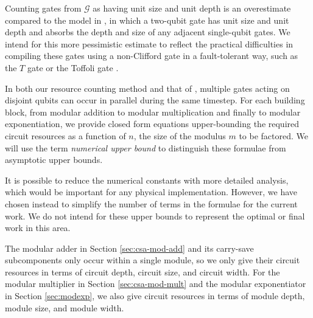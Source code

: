 Counting gates from $\mathcal{G}$ as having unit size and unit depth
is
an overestimate compared to the model in \cite{Kutin2006}, in which a
two-qubit gate has unit size and unit depth and
absorbs the depth and size of any adjacent single-qubit gates. We intend
for this more pessimistic estimate to reflect the practical difficulties
in compiling these gates using a non-Clifford gate in a fault-tolerant way,
such as the $T$ gate or the Toffoli gate
\cite{Fowler2011}.

In both our resource counting method and that of \cite{Fowler2004,Kutin2006}, multiple gates acting on disjoint qubits
can occur in parallel during the same timestep. For each building block,
from modular addition to modular multiplication and finally to modular
exponentiation, we provide closed form equations upper-bounding the required circuit
resources as a function of $n$, the size of the modulus $m$ to be factored.
We will use the
term \emph{numerical upper bound} to distinguish these formulae from asymptotic
upper bounds.

It is possible to reduce the numerical constants with more detailed analysis,
which would be important for any physical implementation.
However, we have chosen instead to simplify the number of terms in the formulae
for the current work. We do not intend for these upper bounds to represent
the optimal or final work in this area.

The modular adder in Section \ref{sec:csa-mod-add} and its carry-save
subcomponents only occur within a single module, so we only give their
circuit resources in terms of circuit depth, circuit size, and circuit width. 
For the modular multiplier in
Section \ref{sec:csa-mod-mult} and the modular exponentiator in
Section \ref{sec:modexp}, we also give circuit resources in
terms of module depth, module size, and module width.